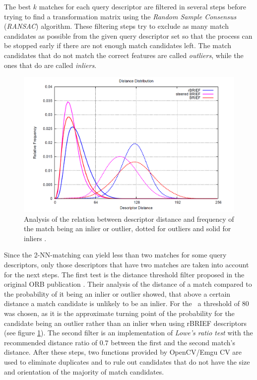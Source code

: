The best $k$ matches for each query descriptor are filtered in several steps before trying to find a transformation matrix using the \emph{Random Sample Consensus} (\emph{RANSAC}) \cite{ransac} algorithm. These filtering steps try to exclude as many match candidates as possible from the given query descriptor set so that the process can be stopped early if there are not enough match candidates left. The match candidates that do not match the correct features are called \emph{outliers}, while the ones that do are called \emph{inliers}.

\begin{figure}[h!]
	\centering
	\includegraphics[scale=0.3]{fig/distance_threshold_orb.png}
	\caption{Analysis of the relation between descriptor distance and frequency of the match being an inlier or outlier, dotted for outliers and solid for inliers \cite[p.~4]{orb}.}\label{fig:dist-thresh}
\end{figure}

Since the 2-NN-matching can yield less than two matches for some query descriptors, only those descriptors that have two matches are taken into account for the next steps. The first test is the distance threshold filter proposed in the original ORB publication \cite{orb}. Their analysis of the distance of a match compared to the probability of it being an inlier or outlier showed, that above a certain distance a match candidate is unlikely to be an inlier. For the \vd~a threshold of $80$ was chosen, as it is the approximate turning point of the probability for the candidate being an outlier rather than an inlier when using rBRIEF descriptors (see figure \ref{fig:dist-thresh}). The second filter is an implementation of \emph{Lowe's ratio test} \cite{lowes_ratio} with the recommended distance ratio of $0.7$ between the first and the second match's distance. After these steps, two functions provided by OpenCV/Emgu CV are used to eliminate duplicates and to rule out candidates that do not have the size and orientation of the majority of match candidates.

